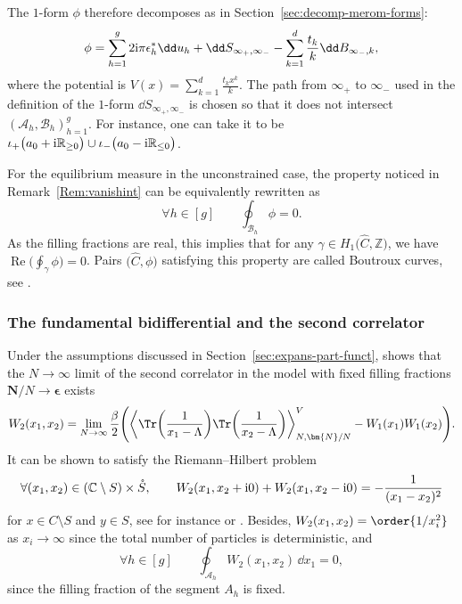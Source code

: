 \documentclass[10pt,a4paper]{amsart}
\numberwithin{equation}{section}
\newcommand{\CC}{\mathbb{C}}
\newcommand{\A}{\mathcal{A}}
\begin{document}
The $1$-form $\phi$ therefore decomposes as in Section~\ref{sec:decomp-merom-forms}:
\begin{equation}\label{eq:decomp-omega}
 \phi = \sum_{h=1}^{g} 2{\rm i}\pi\epsilon^{*}_{h}\dd u_{h} + \dd S_{\infty_{+}, \infty_{-}} - \sum_{k=1}^{d}\frac{t_{k}}{k} \dd B_{\infty_{-}, k},
\end{equation}
where the potential is $V(x) = \sum_{k = 1}^{d} \frac{t_kx^k}{k}$. The path from $\infty_+$ to $\infty_-$ used in the definition of the $1$-form $\dd S_{\infty_+,\infty_-}$ is chosen so that it does not intersect $(\mathcal{A}_h,\mathcal{B}_h)_{h = 1}^{g}$. For instance, one can take it to be $\iota_+\bigl(a_0 + {\rm i}\mathbb{R}_{\geq 0}\bigr) \cup \iota_-\bigl(a_0 - {\rm i}\mathbb{R}_{\leq 0}\bigr)$.

\begin{Remark}\label{remB0} For the equilibrium measure in the unconstrained case, the property noticed in Remark~\ref{Rem:vanishint} can be equivalently rewritten as
\[
\forall h \in [g] \qquad \oint_{\mathcal{B}_h} \phi = 0.
\]
As the filling fractions are real, this implies that for any $\gamma \in H_1\bigl(\widehat{C},\mathbb{Z}\bigr)$, we have $\operatorname{Re}\bigl(\oint_{\gamma} \phi\bigr) = 0$. Pairs $\bigl(\widehat{C},\phi\bigr)$ satisfying this property are called Boutroux curves, see \cite{bertola_boutroux_2007}.
\end{Remark}

\subsubsection{The fundamental bidifferential and the second correlator}
\label{sec:second-corr-fund}

Under the assumptions discussed in Section~\ref{sec:expans-part-funct}, \cite{BGmulti} shows that the $N \to \infty$ limit of the second correlator in the model with
fixed filling fractions $\bm{N}/N \rightarrow \bm{\epsilon}$ exists
\begin{equation*}
 W_{2}(x_1,x_2) = \lim_{N \to \infty} \frac{\beta}{2}\Biggl(\bigg\langle\Tr\biggl(\frac{1}{x_1 - \Lambda}\biggr)\Tr\biggl(\frac{1}{x_2 - \Lambda}\biggr)\bigg\rangle^{V}_{N,\bm{N}/N} - W_{1}(x_1)W_{1}(x_2)\Biggr).
\end{equation*}
It can be shown to satisfy the Riemann--Hilbert problem
\begin{equation}
\label{RH2}
 \forall (x_1,x_2) \in (\CC \setminus S) \times \mathring{S},\qquad W_{2}(x_1,x_2 + {\rm i}0) + W_{2}(x_1,x_2 - {\rm i}0) = -\frac{1}{(x_1 - x_2)^{2}}
\end{equation}
for $x \in C\setminus S$ and $y \in S$, see for instance \cite[Chapter
3]{CoursEynard} or \cite{BEO}. Besides, $W_2(x_1,x_2) = \order{1/x_i^2}$ as $x_i \rightarrow \infty$ since the total number of particles is deterministic, and
\begin{equation}
\label{Aw2}
\forall h \in [g]\qquad \oint_{\A_h} W_2(x_1,x_2)\,\dd x_1 = 0,
\end{equation}
since the filling fraction of the segment $A_h$ is fixed.
\end{document}
